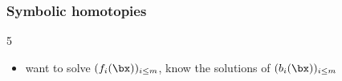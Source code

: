 \documentclass[mathserif,11pt]{beamer}
\begin{document}
\begin{frame}

\frametitle{Symbolic homotopies}

\begin{overlayarea}{\linewidth}{5\baselineskip}

\begin{itemize}
\item want to solve $(f_i(\bx))_{i \le m}$, know the solutions of $(b_i(\bx))_{i\le m}$
 
\end{itemize}
\end{overlayarea}


\end{frame}
\end{document}
